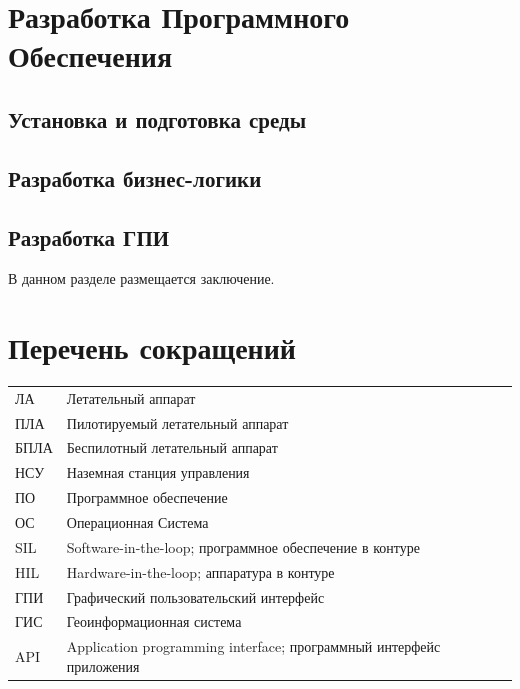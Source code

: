 \documentclass[specification,annotation]{itmo-student-thesis}
\begin{document}
\chapterconclusion

\chapter{Разработка Программного Обеспечения}\label{ch:designarch}

\section{Установка и подготовка среды}\label{sec:devenviron}

\section{Разработка бизнес-логики}\label{sec:devlogic}

\section{Разработка ГПИ}\label{sec:devgui}

\chapterconclusion

\startconclusionpage

В данном разделе размещается заключение.

\printmainbibliography

\appendix

\chapter{Перечень сокращений}\label{sec:app:1}

\begin{table}[!h]
  \centering
  \begin{tabularx}{\textwidth}{L{0.5} L{1.5}}
    \hline
    ЛА & Летательный аппарат \\
    ПЛА & Пилотируемый летательный аппарат \\
    БПЛА & Беспилотный летательный аппарат \\
    НСУ & Наземная станция управления \\
    ПО & Программное обеспечение \\
    ОС & Операционная Система \\
    SIL & Software-in-the-loop; программное обеспечение в контуре \\
    HIL & Hardware-in-the-loop; аппаратура в контуре \\
    ГПИ & Графический пользовательский интерфейс \\
    ГИС & Геоинформационная система \\
    API & Application programming interface; программный интерфейс приложения \\
    \hline
  \end{tabularx}
\end{table}
\end{document}
